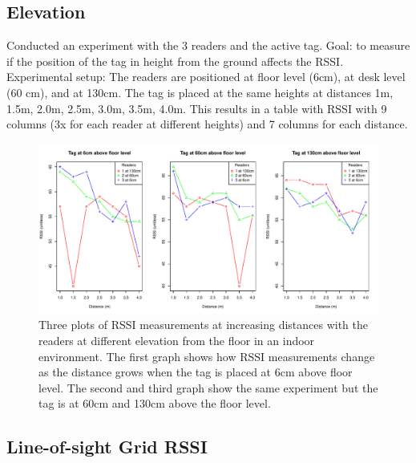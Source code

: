\subsection{Elevation}

Conducted an experiment with the 3 readers and the active tag. Goal: to measure if the position of the tag in height from the ground affects the RSSI. Experimental setup: The readers are positioned at floor level (6cm), at desk level (60 cm), and at 130cm. The tag is placed at the same heights at distances 1m, 1.5m, 2.0m, 2.5m, 3.0m, 3.5m, 4.0m. This results in a table with RSSI with 9 columns (3x for each reader at different heights) and 7 columns for each distance.

\begin{figure}[H]
	\begin{center}
		\includegraphics[width=1\textwidth]{figures/rssi_distance_4m}
		\caption{Three plots of RSSI measurements at increasing distances with the readers at different elevation from the floor in an indoor environment. The first graph shows how RSSI measurements change as the distance grows when the tag is placed at 6cm above floor level. The second and third graph show the same experiment but the tag is at 60cm and 130cm above the floor level.}
	\end{center}
\end{figure}


\subsection{Line-of-sight Grid RSSI}

